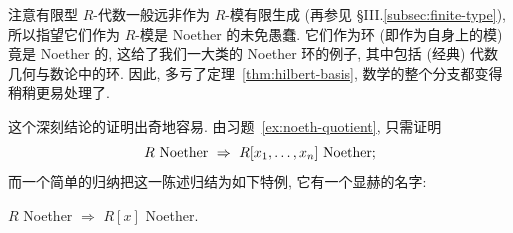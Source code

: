 注意有限型 $R$-代数一般远非作为 $R$-模有限生成 (再参见 §III.\ref{subsec:finite-type}), 所以指望它们作为 $R$-模是 Noether 的未免愚蠢. 它们作为环 (即作为自身上的模) 竟是 Noether 的, 这给了我们一大类的 Noether 环的例子, 其中包括 (经典) 代数几何与数论中的环. 因此, 多亏了定理~\ref{thm:hilbert-basis}, 数学的整个分支都变得稍稍更易处理了.

这个深刻结论的证明出奇地容易. 由习题~\ref{ex:noeth-quotient}, 只需证明
\[
\index{Noether@Noether!mo@模(module)}R\text{ Noether}\ \Rightarrow\ R[x_1,\dots,x_n]\text{ Noether};
\]
而一个简单的归纳把这一陈述归结为如下特例, 它有一个显赫的名字:

\begin{lemma}\label{lem:hilbert-basis}
$R$ Noether $\Rightarrow$ $R[x]$ Noether.
\end{lemma}


